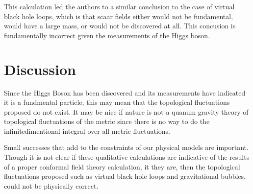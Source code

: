 \documentclass[%
 reprint,
 amsmath,amssymb,
 aps,
]{revtex4-1}
\begin{document}
This calculation led the authors to a similar conclusion to the case of virtual black hole loops, which is that scaar fields either would not be fundamental, would have a large mass, or would not be discovered at all. This concusion is fundamentally incorrect given the measurements of the Higgs boson.


\section{Discussion}

Since the Higgs Boson has been discovered and its measurements have indicated it is a fundmental particle, this may mean that the topological fluctuations proposed do not exist. It may be nice if nature is not a quanum gravity theory of topological fluctuations of the metric since there is no way to do the infinite\textemdash dimentional integral over all metric fluctuations.

Small successes that add to the constraints of our physical models are important. Though it is not clear if these qualitative calculations are indicative of the results of a proper conformal field theory calculation, it they are, then the topological fluctuations proposed such as virtual black hole loops and gravitational bubbles, could not be physically correct.
\end{document}
